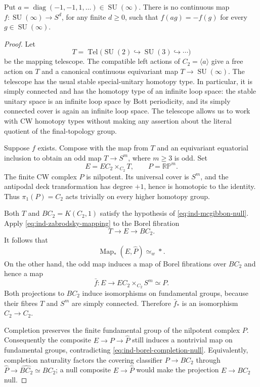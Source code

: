 \begin{lemma}\label{lem:ind-no-odd-stable-su}
Put $a=\operatorname{diag}(-1,-1,1,\ldots)\in\operatorname{SU}(\infty)$. There is no
continuous map $f:\operatorname{SU}(\infty)\to S^d$, for any finite $d\ge0$,
such that $f(ag)=-f(g)$ for every $g\in\operatorname{SU}(\infty)$.
\end{lemma}

\begin{proof}
Let
\[
T=\operatorname{Tel}\bigl(\operatorname{SU}(2)\hookrightarrow\operatorname{SU}(3)
\hookrightarrow\cdots\bigr)
\]
be the mapping telescope. The compatible left actions of
$C_2=\langle a\rangle$ give a free action on $T$ and a canonical
continuous equivariant map $T\to\operatorname{SU}(\infty)$. The telescope has
the usual stable special-unitary homotopy type. In particular, it
is simply connected and has the homotopy type of an infinite loop
space: the stable unitary space is an infinite loop space by Bott
periodicity, and its simply connected cover is again an infinite
loop space. The telescope allows us to work with CW homotopy types
without making any assertion about the literal quotient of the
final-topology group.

Suppose $f$ exists. Compose with the map from $T$ and an equivariant
equatorial inclusion to obtain an odd map $T\to S^m$, where
$m\ge3$ is odd. Set
\[
E=EC_2\times_{C_2}T,\qquad P=\mathbb{RP}^m.
\]
The finite CW complex $P$ is nilpotent. Its universal cover is
$S^m$, and the antipodal deck transformation has degree $+1$, hence
is homotopic to the identity. Thus $\pi_1(P)=C_2$ acts trivially
on every higher homotopy group.

Both $T$ and $BC_2=K(C_2,1)$ satisfy the hypothesis of
\eqref{eq:ind-mcgibbon-null}. Apply \eqref{eq:ind-zabrodsky-mapping} to
the Borel fibration
\[
T\longrightarrow E\longrightarrow BC_2.
\]
It follows that
\begin{equation}\label{eq:ind-borel-completion-null}
\operatorname{Map}_*(E,\widehat P)\simeq_w *.
\end{equation}
On the other hand, the odd map induces a map of Borel fibrations
over $BC_2$ and hence a map
\[
\bar f:E\longrightarrow EC_2\times_{C_2}S^m\simeq P.
\]
Both projections to $BC_2$ induce isomorphisms on fundamental
groups, because their fibres $T$ and $S^m$ are simply connected.
Therefore $\bar f_*$ is an isomorphism $C_2\to C_2$.

Completion preserves the finite fundamental group of the nilpotent
complex $P$. Consequently the composite $E\to P\to\widehat P$
still induces a nontrivial map on fundamental groups, contradicting
\eqref{eq:ind-borel-completion-null}. Equivalently, completion
naturality factors the covering classifier $P\to BC_2$ through
$\widehat P\to\widehat{BC_2}\simeq BC_2$; a null composite
$E\to\widehat P$ would make the projection $E\to BC_2$ null.
\end{proof}

